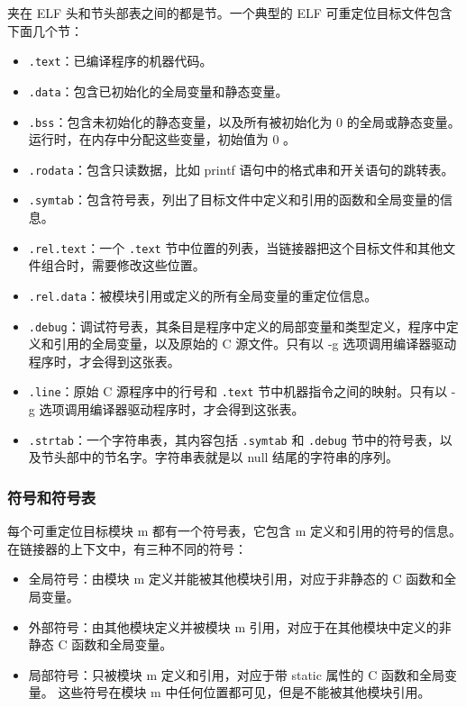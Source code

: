 夹在 ELF 头和节头部表之间的都是节。一个典型的 ELF 可重定位目标文件包含下面几个节：
\begin{itemize}
    \item \texttt{.text}：已编译程序的机器代码。
    \item \texttt{.data}：包含已初始化的全局变量和静态变量。
    \item \texttt{.bss}：包含未初始化的静态变量，以及所有被初始化为 0 的全局或静态变量。运行时，在内存中分配这些变量，初始值为 0 。
    \item \texttt{.rodata}：包含只读数据，比如 printf 语句中的格式串和开关语句的跳转表。
    \item \texttt{.symtab}：包含符号表，列出了目标文件中定义和引用的函数和全局变量的信息。
    \item \texttt{.rel.text}：一个 \texttt{.text} 节中位置的列表，当链接器把这个目标文件和其他文件组合时，需要修改这些位置。
    \item \texttt{.rel.data}：被模块引用或定义的所有全局变量的重定位信息。
    \item \texttt{.debug}：调试符号表，其条目是程序中定义的局部变量和类型定义，程序中定义和引用的全局变量，以及原始的 C 源文件。只有以 -g 选项调用编译器驱动程序时，才会得到这张表。
    \item \texttt{.line}：原始 C 源程序中的行号和 \texttt{.text} 节中机器指令之间的映射。只有以 -g 选项调用编译器驱动程序时，才会得到这张表。
    \item \texttt{.strtab}：一个字符串表，其内容包括 \texttt{.symtab} 和 \texttt{.debug} 节中的符号表，以及节头部中的节名字。字符串表就是以 null 结尾的字符串的序列。
\end{itemize}

\subsubsection{符号和符号表}

每个可重定位目标模块 m 都有一个符号表，它包含 m 定义和引用的符号的信息。
在链接器的上下文中，有三种不同的符号：
\begin{itemize}
    \item 全局符号：由模块 m 定义并能被其他模块引用，对应于非静态的 C 函数和全局变量。
    \item 外部符号：由其他模块定义并被模块 m 引用，对应于在其他模块中定义的非静态 C 函数和全局变量。
    \item 局部符号：只被模块 m 定义和引用，对应于带 static 属性的 C 函数和全局变量。 这些符号在模块 m 中任何位置都可见，但是不能被其他模块引用。
\end{itemize}

